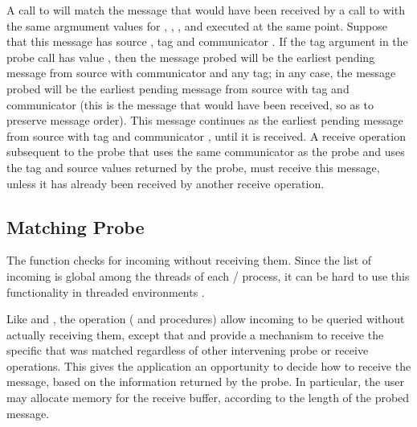 \begin{implementors}
A call to  will match the
message that would have been received by a call to 
with the same argmument values for , , , and  executed at the same point.
Suppose
that this message has source , tag  and communicator
.  If the
tag argument in the probe call has value ,
then the message probed
will be the earliest pending message from source 
with communicator  and any tag; in any case, the message probed will be the
earliest pending message from source  with tag  and
communicator
 (this is
the message that would have been received, so as to preserve message order).
This message continues as the earliest pending message
from source  with tag  and communicator , until it is received.
A receive operation subsequent to the probe that uses the same communicator as the
probe and uses the tag and source values returned by the probe, must receive
this message, unless it has already been received by another receive operation.
\end{implementors}

\subsection{Matching Probe}
\label{sec:matching-probe}

The function  checks for incoming  without
receiving them. Since the list of incoming  is global among the
threads of each \MPI/ process, it can be hard to use this functionality
in threaded environments \cite{mprobe-paper,mprobe-proposal-rev4}.

Like  and , the
 operation (%
 and  procedures) allow incoming
 to be queried without actually receiving them, except that
 and  provide a mechanism to receive the specific
 that was matched regardless of other intervening probe or
receive operations. This gives the application an opportunity to decide
how to receive the message, based on the information returned by
the probe. In particular, the user may allocate memory for the receive
buffer, according to the length of the probed message.

